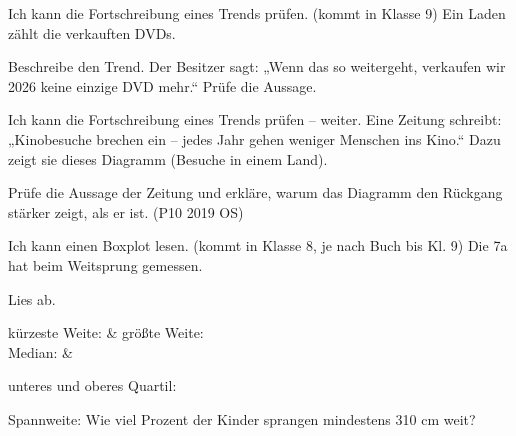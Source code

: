 \begin{aufgabe}{Ich kann die Fortschreibung eines Trends prüfen. (kommt in Klasse 9)}
Ein Laden zählt die verkauften DVDs.


\begin{teile}
\teil Beschreibe den Trend.
\teil Der Besitzer sagt: „Wenn das so weitergeht, verkaufen wir 2026 keine einzige DVD mehr.“ Prüfe die Aussage.
\end{teile}
\end{aufgabe}

\begin{aufgabe}{Ich kann die Fortschreibung eines Trends prüfen – weiter.}
Eine Zeitung schreibt: „Kinobesuche brechen ein – jedes Jahr gehen weniger Menschen ins Kino.“ Dazu zeigt sie dieses Diagramm (Besuche in einem Land).


\begin{teile}
\teil Prüfe die Aussage der Zeitung und erkläre, warum das Diagramm den Rückgang stärker zeigt, als er ist. (P10 2019 OS)
\end{teile}
\end{aufgabe}

\begin{aufgabe}{Ich kann einen Boxplot lesen. (kommt in Klasse 8, je nach Buch bis Kl. 9)}
Die 7a hat beim Weitsprung gemessen.

\begin{boxplots}[xmin=240,xmax=480,xstep=10,xlabel=Weite in cm]
\end{boxplots}

Lies ab.
\begin{teilezwei}
\tz kürzeste Weite: \leerfeld[cm] & \tz größte Weite: \leerfeld[cm] \\
\tz Median: \leerfeld[cm] & \\
\end{teilezwei}
\begin{teile}
\teil unteres und oberes Quartil: \leerfeld[cm] \quad \leerfeld[cm]
\end{teile}

\begin{teile}
\teil Spannweite: \leerfeld[cm]
\teil Wie viel Prozent der Kinder sprangen mindestens 310 cm weit? \hfill \leerfeld[\%]
\end{teile}
\end{aufgabe}

